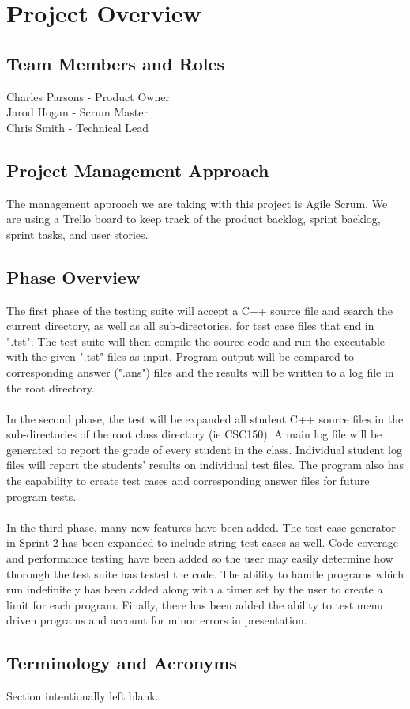 

\chapter{Project Overview}


\section{Team Members and Roles}
Charles Parsons - Product Owner
\\Jarod Hogan - Scrum Master
\\Chris Smith - Technical Lead


\section{Project  Management Approach}
The management approach we are taking with this project is Agile Scrum. We are using a 
Trello board to keep track of the product backlog, sprint backlog, sprint tasks, and user stories.


\section{Phase  Overview}
The first phase of the testing suite will accept a C++ source file and search the current
directory, as well as all sub-directories, for test case files that end in ".tst". The test suite
will then compile the source code and run the executable with the given ".tst" files as input. Program
output will be compared to corresponding answer (".ans") files and the results will be written to a 
log file in the root directory.
\\\\In the second phase, the test will be expanded all student C++ source files in the sub-directories
of the root class directory (ie CSC150). A main log file will be generated to report the grade of every student in the class. Individual student log files will report the students' results on individual test files. The program also has the capability to create test cases and corresponding answer files for future program tests.
\\\\In the third phase, many new features have been added. The test case generator in Sprint 2 has been expanded to include string test cases as well. Code coverage and performance testing have been added so the user may easily determine how thorough the test suite has tested the code. The ability to handle programs which run indefinitely has been added along with a timer set by the user to create a limit for each program. Finally, there has been added the ability to test menu driven programs and account for minor errors in presentation. 


\section{Terminology and Acronyms}
Section intentionally left blank.
